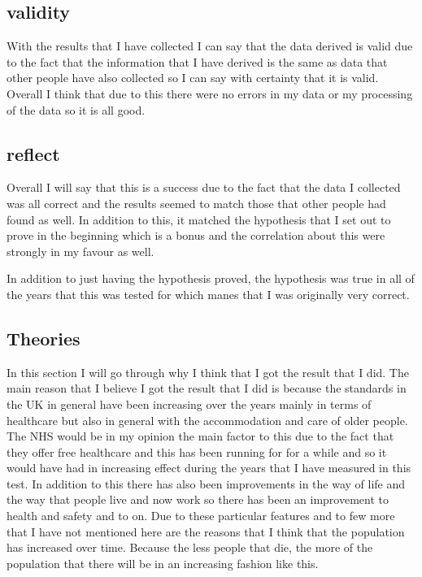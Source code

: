 \documentclass{article}
\begin{document}
\subsection{validity}
With the results that I have collected I can say that the data derived is valid due to the fact that the information that I have derived is the same as data that other people have also collected so I can say with certainty that it is valid. Overall I think that due to this there were no errors in my data or my processing of the data so it is all good. 
\subsection{reflect}
Overall I will say that this is a success due to the fact that the data I collected was all correct and the results seemed to match those that other people had found as well. In addition to this, it matched the hypothesis that I set out to prove in the beginning which is a bonus and the correlation about this were strongly in my favour as well.  

In addition to just having the hypothesis proved, the hypothesis was true in all of the years that this was tested for which manes that I was originally very correct.  
\subsection{Theories}
In this section I will go through why I think that I got the result that I did. The main reason that I believe I got the result that I did is because the standards in the UK in general have been increasing over the years mainly in terms of healthcare but also in general with the accommodation and care of older people. The NHS would be in my opinion the main factor to this due to the fact that they offer free healthcare and this has been running for for a while and so it would have had in increasing effect during the years that I have measured in this test. In addition to this there has also been improvements in the way of life and the way that people live and now work so there has been an improvement to health and safety and to on. Due to these particular features and to few more that I have not mentioned here are the reasons that I think that the population has increased over time. Because the less people that die, the more of the population that there will be in an increasing fashion like this. 
\end{document}
